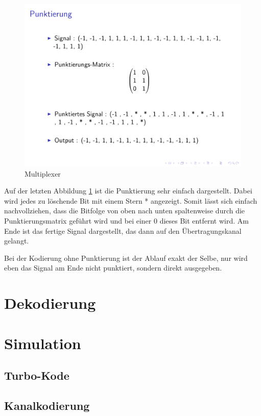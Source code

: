 \begin{figure}[!ht]
\centering
\includegraphics[width=\ScaleIfNeeded]{pictures/TurboEncodePunctured5}
\caption{Multiplexer}
\label{pic:TurboEncodePuncturing}
\end{figure}  

Auf der letzten Abbildung \ref{pic:TurboEncodePuncturing} ist die Punktierung sehr einfach dargestellt. Dabei wird jedes zu löschende Bit mit einem Stern * angezeigt. Somit lässt sich einfach nachvollziehen, dass die Bitfolge von oben nach unten spaltenweise durch die Punktierungsmatrix geführt wird und bei einer 0 dieses Bit entfernt wird. Am Ende ist das fertige Signal dargestellt, das dann auf den Übertragungskanal gelangt. 

Bei der Kodierung ohne Punktierung ist der Ablauf exakt der Selbe, nur wird eben das Signal am Ende nicht punktiert, sondern direkt ausgegeben.

\section{Dekodierung}
\label{sec:visualization_decode}

\section{Simulation}
\label{sec:visualization_simulation}

\subsection{Turbo-Kode}
\label{sec:visualization_simulations_turbo}

\subsection{Kanalkodierung}
\label{sec:visualization_simulations_channelcoding}